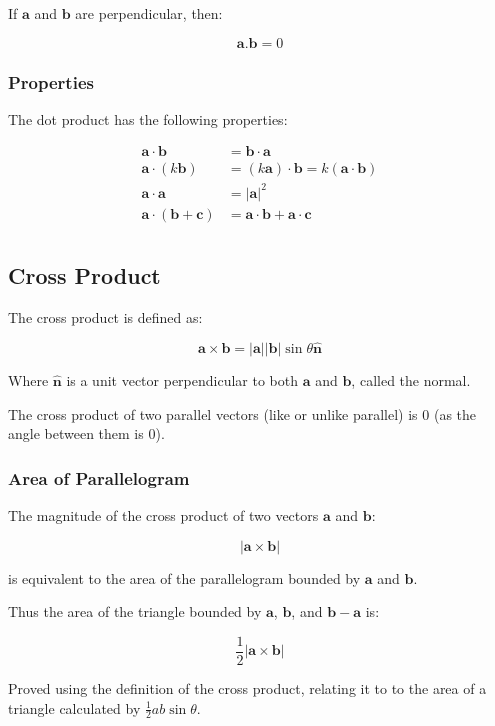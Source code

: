 \documentclass[a4paper,11pt]{article}
\newcommand{\bb}{\boldsymbol}
\begin{document}
If $\bb{a}$ and $\bb{b}$ are perpendicular, then:

$$
\bb{a} . \bb{b} = 0
$$


\subsubsection{Properties}

The dot product has the following properties:

$$
\begin{aligned}
	\bb{a} \cdot \bb{b} & = \bb{b} \cdot \bb{a} \\
	\bb{a} \cdot (k \bb{b}) & = (k \bb{a}) \cdot \bb{b} = k (\bb{a} \cdot \bb{b}) \\
	\bb{a} \cdot \bb{a} & = \lvert \bb{a} \rvert^2 \\
	\bb{a} \cdot (\bb{b} + \bb{c}) & = \bb{a} \cdot \bb{b} + \bb{a} \cdot \bb{c} \\
\end{aligned}
$$


\subsection{Cross Product}

The cross product is defined as:

$$
\bb{a} \times \bb{b} = \lvert \bb{a} \rvert \lvert \bb{b} \rvert \sin{\theta} \hat{\bb{n}}
$$

Where $\hat{\bb{n}}$ is a unit vector perpendicular to both $\bb{a}$ and
$\bb{b}$, called the normal.

The cross product of two parallel vectors (like or unlike parallel) is 0 (as
the angle between them is 0).


\subsubsection{Area of Parallelogram}

The magnitude of the cross product of two vectors $\bb{a}$ and $\bb{b}$:

$$
\lvert \bb{a} \times \bb{b} \rvert
$$

is equivalent to the area of the parallelogram bounded by $\bb{a}$ and $\bb{b}$.

Thus the area of the triangle bounded by $\bb{a}$, $\bb{b}$, and
$\bb{b} - \bb{a}$ is:

$$
\frac{1}{2} \lvert \bb{a} \times \bb{b} \rvert
$$

Proved using the definition of the cross product, relating it to to the area of
a triangle calculated by $\frac{1}{2} a b \sin{\theta}$.
\end{document}

